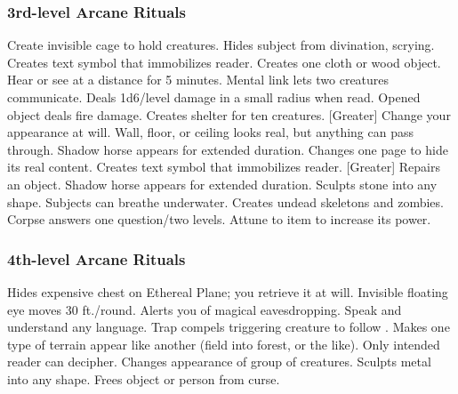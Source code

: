 \subsubsection{3rd-level Arcane Rituals}
\begin{rituallist}
     Create invisible cage to hold creatures.
     Hides subject from divination, scrying.
     Creates text symbol that immobilizes reader.
     Creates one cloth or wood object.
     Hear or see at a distance for 5 minutes.
     Mental link lets two creatures communicate.
     Deals 1d6/level damage in a small radius when read.
     Opened object deals fire damage.
     Creates shelter for ten creatures.
    [Greater] Change your appearance at will.
     Wall, floor, or ceiling looks real, but anything can pass through.
     Shadow horse appears for extended duration.
     Changes one page to hide its real content.
     Creates text symbol that immobilizes reader.
    [Greater] Repairs an object.
     Shadow horse appears for extended duration.
     Sculpts stone into any shape.
     Subjects can breathe underwater.
     Creates undead skeletons and zombies.
     Corpse answers one question/two levels.
     Attune to item to increase its power.
\end{rituallist}

\subsubsection{4th-level Arcane Rituals}
\begin{rituallist}
    \F Hides expensive chest on Ethereal Plane; you retrieve it at will.
     Invisible floating eye moves 30 ft./round.
     Alerts you of magical eavesdropping.
     Speak and understand any language.
     Trap compels triggering creature to follow .
     Makes one type of terrain appear like another (field into forest, or the like).
     Only intended reader can decipher.
     Changes appearance of group of creatures.
     Sculpts metal into any shape.
     Frees object or person from curse.
\end{rituallist}


